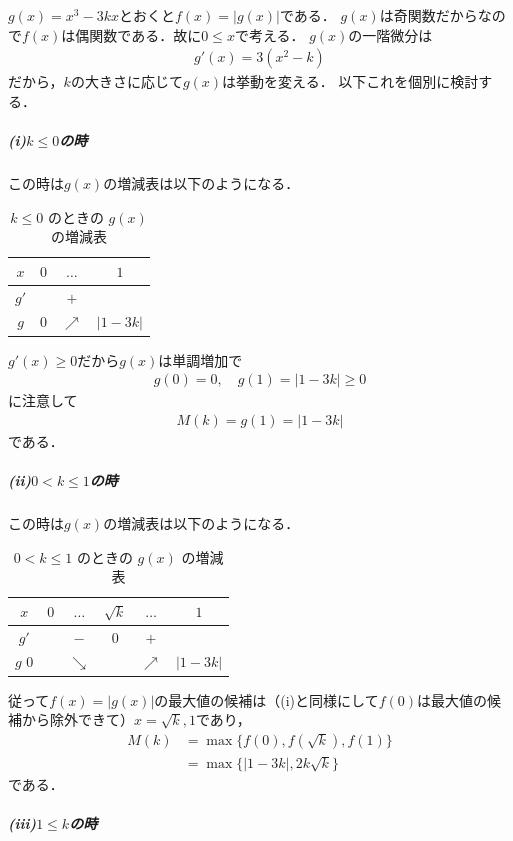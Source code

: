 \documentclass[../../main.tex]{subfiles}
\begin{document}
$g(x)=x^3-3kx$とおくと$f(x)=|g(x)|$である．
$g(x)$は奇関数だからなので$f(x)$は偶関数である．故に$0\le x$で考える．
$g(x)$の一階微分は
\begin{align}
  g'(x)=3(x^2-k)
\end{align}
だから，$k$の大きさに応じて$g(x)$は挙動を変える．
以下これを個別に検討する．

\subparagraph{(i)$k\le0$の時}

この時は$g(x)$の増減表は以下のようになる．

\begin{table}[htb]
  \centering
  \caption{$k\le 0$ のときの $g(x)$ の増減表}
  \label{tab:variation_k_le_0}
  \begin{tabular}{c|c|c|c}
    $x$ & $0$ & $\dots$ & $1$ \\ \hline
    $g'$ & & $+$ & \\ \hline
    $g$ & $0$ & $\nearrow$ & $|1-3k|$
  \end{tabular}
\end{table}

$g'(x)\ge0$だから$g(x)$は単調増加で
\begin{align}
  g(0)=0, \quad
  g(1)=|1-3k|\ge0
\end{align}
に注意して
\begin{align}
  M(k)=g(1)=|1-3k|
\end{align}
である．

\subparagraph{(ii)$0<k\le 1$の時}

この時は$g(x)$の増減表は以下のようになる．

\begin{table}[htb]
  \centering
  \caption{$0<k\le 1$ のときの $g(x)$ の増減表}
  \label{tab:variation_k_le_1}
  \begin{tabular}{c|c|c|c|c|c}
    $x$ & $0$ & $\dots$ & $\sqrt{k}$ & $\dots$ & $1$ \\ \hline
    $g' $     &   & $-$ & $0$ & $+$ & \\ \hline
    $g  $ $0$ & & $\searrow$ & & $\nearrow$ & $|1-3k|$
  \end{tabular}
\end{table}

従って$f(x)=|g(x)|$の最大値の候補は（(i)と同様にして$f(0)$は最大値の候補から除外できて）$x=\sqrt{k},1$であり，
\begin{align}
  M(k)&=\max\{f(0),f(\sqrt{k}),f(1)\} \\
  &=\max\{|1-3k|,2k\sqrt{k}\}
\end{align}
である．

\subparagraph{(iii)$1\le k$の時}
\end{document}
